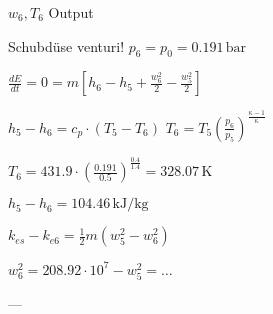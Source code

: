 \( w_6, T_6 \) Output  

Schubdüse venturi! \( p_6 = p_0 = 0.191 \, \text{bar} \)  

\( \frac{dE}{dt} = 0 = m \left[ h_6 - h_5 + \frac{w_6^2}{2} - \frac{w_5^2}{2} \right] \)  

\( h_5 - h_6 = c_p \cdot (T_5 - T_6) \)  
\( T_6 = T_5 \left( \frac{p_6}{p_5} \right)^{\frac{\kappa - 1}{\kappa}} \)  

\( T_6 = 431.9 \cdot \left( \frac{0.191}{0.5} \right)^{\frac{0.4}{1.4}} = 328.07 \, \text{K} \)  

\( h_5 - h_6 = 104.46 \, \text{kJ/kg} \)  

\( k_{es} - k_{e6} = \frac{1}{2} m \left( w_5^2 - w_6^2 \right) \)  

\( w_6^2 = 208.92 \cdot 10^7 - w_5^2 = \dots \)  

---